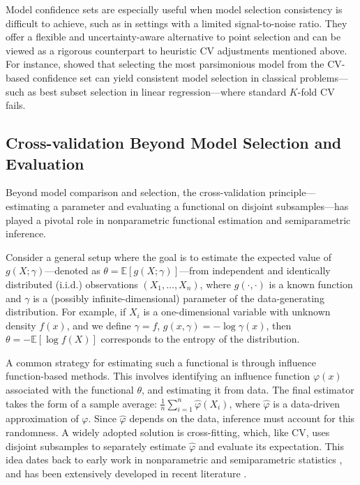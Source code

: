 \documentclass[11pt]{article}
\theoremstyle{plain}
\begin{document}
Model confidence sets are especially useful when model selection consistency is difficult to achieve, such as in settings with a limited signal-to-noise ratio. They offer a flexible and uncertainty-aware alternative to point selection and can be viewed as a rigorous counterpart to heuristic CV adjustments mentioned above. For instance, \cite{lei2020cross} showed that selecting the most parsimonious model from the CV-based confidence set can yield consistent model selection in classical problems---such as best subset selection in linear regression—where standard $K$-fold CV fails.

\subsection{Cross-validation Beyond Model Selection and Evaluation}
Beyond model comparison and selection, the cross-validation principle---estimating a parameter and evaluating a functional on disjoint subsamples---has played a pivotal role in nonparametric functional estimation and semiparametric inference.

Consider a general setup where the goal is to estimate the expected value of $g(X;\gamma)$---denoted as $\theta = \mathbb{E}[g(X; \gamma)]$---from independent and identically distributed (i.i.d.) observations $(X_1, \ldots, X_n)$, where $g(\cdot, \cdot)$ is a known function and $\gamma$ is a (possibly infinite-dimensional) parameter of the data-generating distribution. For example, if $X_i$ is a one-dimensional variable with unknown density $f(x)$, and we define $\gamma = f$, $g(x, \gamma) = -\log \gamma(x)$, then $\theta = -\mathbb{E}[\log f(X)]$ corresponds to the entropy of the distribution.

A common strategy for estimating such a functional is through influence function-based methods. This involves identifying an influence function $\varphi(x)$ associated with the functional $\theta$, and estimating it from data. The final estimator takes the form of a sample average: $\frac{1}{n} \sum_{i=1}^n \hat\varphi(X_i)$, where $\hat\varphi$ is a data-driven approximation of $\varphi$. Since $\hat\varphi$ depends on the data, inference must account for this randomness. A widely adopted solution is cross-fitting, which, like CV, uses disjoint subsamples to separately estimate $\hat\varphi$ and evaluate its expectation. This idea dates back to early work in nonparametric and semiparametric statistics \citep{hasminskii1979nonparametric,pfanzagl1985contributions,schick1986asymptotically,bickel1988estimating}, and has been extensively developed in recent literature \citep{chernozhukov2019inference,kennedy2024semiparametric}.
\end{document}
